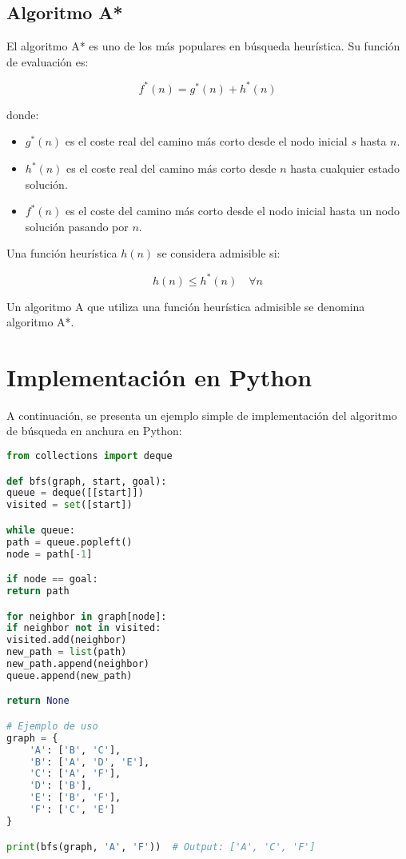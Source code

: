 \documentclass[12pt,a4paper]{report}
\begin{document}
	\subsection{Algoritmo A*}
	
	El algoritmo A* es uno de los más populares en búsqueda heurística. Su función de evaluación es:
	
	\[ f^*(n) = g^*(n) + h^*(n) \]
	
	donde:
	\begin{itemize}
		\item $g^*(n)$ es el coste real del camino más corto desde el nodo inicial $s$ hasta $n$.
		\item $h^*(n)$ es el coste real del camino más corto desde $n$ hasta cualquier estado solución.
		\item $f^*(n)$ es el coste del camino más corto desde el nodo inicial hasta un nodo solución pasando por $n$.
	\end{itemize}
	
	Una función heurística $h(n)$ se considera admisible si:
	
	\[ h(n) \leq h^*(n) \quad \forall n \]
	
	Un algoritmo A que utiliza una función heurística admisible se denomina algoritmo A*.
	
	\section{Implementación en Python}
	
	A continuación, se presenta un ejemplo simple de implementación del algoritmo de búsqueda en anchura en Python:
	
	\begin{lstlisting}[language=Python]
from collections import deque

def bfs(graph, start, goal):
queue = deque([[start]])
visited = set([start])

while queue:
path = queue.popleft()
node = path[-1]

if node == goal:
return path

for neighbor in graph[node]:
if neighbor not in visited:
visited.add(neighbor)
new_path = list(path)
new_path.append(neighbor)
queue.append(new_path)

return None

# Ejemplo de uso
graph = {
    'A': ['B', 'C'],
    'B': ['A', 'D', 'E'],
    'C': ['A', 'F'],
    'D': ['B'],
    'E': ['B', 'F'],
    'F': ['C', 'E']
}

print(bfs(graph, 'A', 'F'))  # Output: ['A', 'C', 'F']
	\end{lstlisting}
	
\end{document}

